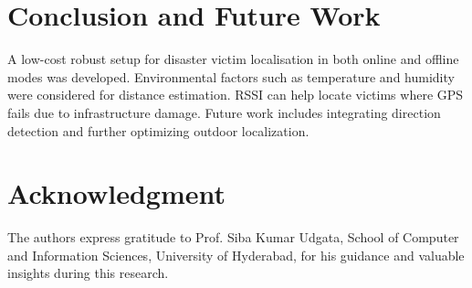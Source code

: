 \documentclass[conference]{IEEEtran}
\begin{document}
\section{Conclusion and Future Work}
A low-cost robust setup for disaster victim localisation in both online and offline modes was developed. Environmental factors such as temperature and humidity were considered for distance estimation. RSSI can help locate victims where GPS fails due to infrastructure damage. Future work includes integrating direction detection and further optimizing outdoor localization.

\section*{Acknowledgment}
The authors express gratitude to Prof. Siba Kumar Udgata, School of Computer and Information Sciences, University of Hyderabad, for his guidance and valuable insights during this research.



\end{document}
